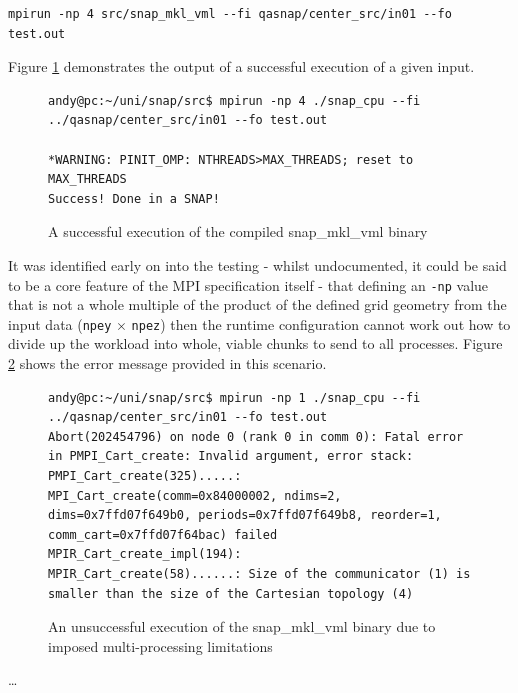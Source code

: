 \documentclass[conference]{IEEEtran}
\begin{document}
\begin{lstlisting}[breaklines]
mpirun -np 4 src/snap_mkl_vml --fi qasnap/center_src/in01 --fo test.out
\end{lstlisting}

Figure \ref{fig:snap-successful-run} demonstrates the output of a successful execution of a given input.

\begin{figure}[!h]
    \centering
    \begin{lstlisting}[breaklines]
andy@pc:~/uni/snap/src$ mpirun -np 4 ./snap_cpu --fi ../qasnap/center_src/in01 --fo test.out

*WARNING: PINIT_OMP: NTHREADS>MAX_THREADS; reset to MAX_THREADS
Success! Done in a SNAP!
    \end{lstlisting}
    \caption{A successful execution of the compiled snap\_mkl\_vml binary}
    \label{fig:snap-successful-run}
\end{figure}

It was identified early on into the testing - whilst undocumented, it could be said to be a core feature of the MPI specification itself - that defining an \texttt{-np} value that is not a whole multiple of the product of the defined grid geometry from the input data (\texttt{npey} $ \times $ \texttt{npez}) then the runtime configuration cannot work out how to divide up the workload into whole, viable chunks to send to all processes. Figure \ref{fig:snap-unsuccessful-run} shows the error message provided in this scenario.

\begin{figure}[h]
    \centering
    \begin{lstlisting}[breaklines]
andy@pc:~/uni/snap/src$ mpirun -np 1 ./snap_cpu --fi ../qasnap/center_src/in01 --fo test.out
Abort(202454796) on node 0 (rank 0 in comm 0): Fatal error in PMPI_Cart_create: Invalid argument, error stack:
PMPI_Cart_create(325).....: MPI_Cart_create(comm=0x84000002, ndims=2, dims=0x7ffd07f649b0, periods=0x7ffd07f649b8, reorder=1, comm_cart=0x7ffd07f64bac) failed
MPIR_Cart_create_impl(194): 
MPIR_Cart_create(58)......: Size of the communicator (1) is smaller than the size of the Cartesian topology (4)
    \end{lstlisting}
    \caption{An unsuccessful execution of the snap\_mkl\_vml binary due to imposed multi-processing limitations}
    \label{fig:snap-unsuccessful-run}
\end{figure}

\dots
\end{document}
